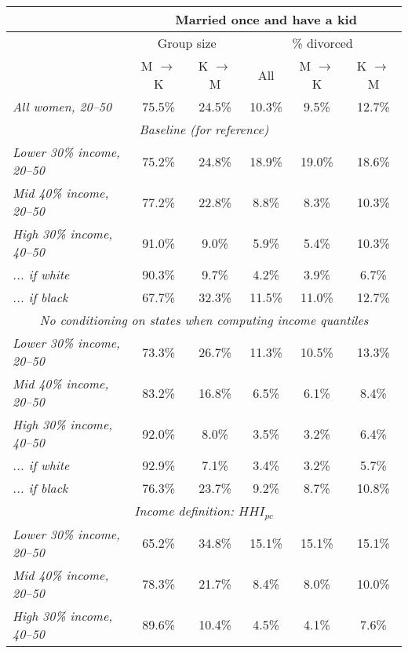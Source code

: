 \documentclass[12pt,letter]{article}
\begin{document}
\begin{table}
\begin{center}
\begin{tabular}{|l|c|c|c|c|c|}\hline
&   \multicolumn{5}{|c|}{\textbf{Married once and have a kid}}\\\hline
&  \multicolumn{2}{|c|}{Group size}   & \multicolumn{3}{|c|}{\% divorced}  \\\hline
& \footnotesize M $\rightarrow$ K &  \footnotesize K $\rightarrow$ M &  All & \footnotesize M $\rightarrow$ K & \footnotesize K $\rightarrow$ M \\\hline
\emph{All women, 20--50} & 75.5\% & 24.5\% & 10.3\% &  9.5\% & 12.7\% \\\hline\hline
\multicolumn{6}{|c|}{\emph{Baseline (for reference)}} \\\hline\hline
\emph{Lower 30\% income, 20--50} &  75.2\% & 24.8\% & 18.9\% & 19.0\% & 18.6\% \\\hline
\emph{Mid 40\% income, 20--50} & 77.2\% & 22.8\% &  8.8\% &  8.3\% & 10.3\% \\\hline
\emph{High 30\% income, 40--50} & 91.0\% &  9.0\% &  5.9\% &  5.4\% & 10.3\% \\
\emph{... if white} & 90.3\% &  9.7\% &  4.2\% &  3.9\% &  6.7\% \\
\emph{... if black} & 67.7\% & 32.3\% & 11.5\% & 11.0\% & 12.7\% \\\hline\hline
\multicolumn{6}{|c|}{\emph{No conditioning on states when computing income quantiles}} \\\hline\hline
\emph{Lower 30\% income, 20--50} & 73.3\% & 26.7\% & 11.3\% & 10.5\% & 13.3\% \\\hline
\emph{Mid 40\% income, 20--50} &   83.2\% & 16.8\% &  6.5\% &  6.1\% &  8.4\% \\\hline
\emph{High 30\% income, 40--50} & 92.0\% &  8.0\% &  3.5\% &  3.2\% &  6.4\% \\
\emph{... if white} & 92.9\% &  7.1\% &  3.4\% &  3.2\% &  5.7\% \\
\emph{... if black} & 76.3\% & 23.7\% &  9.2\% &  8.7\% & 10.8\% \\\hline\hline
\multicolumn{6}{|c|}{\emph{Income definition: $HHI_{pc}$}} \\\hline\hline
\emph{Lower 30\% income, 20--50} &  65.2\% & 34.8\% & 15.1\% & 15.1\% & 15.1\% \\\hline
\emph{Mid 40\% income, 20--50} & 78.3\% & 21.7\% &  8.4\% &  8.0\% & 10.0\% \\\hline
\emph{High 30\% income, 40--50}& 89.6\% & 10.4\% &  4.5\% &  4.1\% &  7.6\% \\

\end{tabular}
\end{center}
\end{table}
\end{document}
